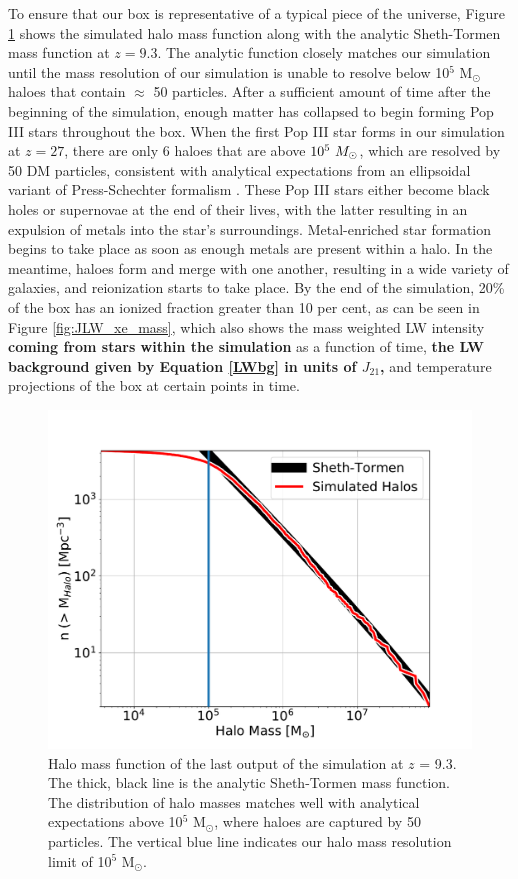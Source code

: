 \documentclass[fleqn,usenatbib]{mnras}
\begin{document}
To ensure that our box is representative of a typical piece of the universe, Figure \ref{fig:hmf} shows the simulated halo mass function along with the analytic Sheth-Tormen mass function at $z = 9.3$. The analytic function closely matches our simulation until the mass resolution of our simulation is unable to resolve below 10$^{5}$ M$_{\odot}$ haloes that contain $\approx$ 50 particles. After a sufficient amount of time after the beginning of the simulation, enough matter has collapsed to begin forming Pop III stars throughout the box. When the first Pop III star forms in our simulation at $z = 27$, there are only 6 haloes that are above $10^5~\Ms$, which are resolved by 50 DM particles, consistent with analytical expectations from an ellipsoidal variant of Press-Schechter formalism \citep{PS74,Sheth01}. These Pop III stars either become black holes or supernovae at the end of their lives, with the latter resulting in an expulsion of metals into the star's surroundings. Metal-enriched star formation begins to take place as soon as enough metals are present within a halo. In the meantime, haloes form and merge with one another, resulting in a wide variety of galaxies, and reionization starts to take place. By the end of the simulation, 20\% of the box has an ionized fraction greater than 10 per cent, as can be seen in Figure \ref{fig:JLW_xe_mass}, which also shows the mass weighted LW intensity \textbf{coming from stars within the simulation} as a function of time, \textbf{the LW background given by Equation \ref{LWbg} in units of $J_{21}$,} and temperature projections of the box at certain points in time. 

\begin{figure}
	\includegraphics[width=\columnwidth]{images/hmf.pdf}
    \caption{Halo mass function of the last output of the simulation at $z$ = 9.3. The thick, black line is the analytic Sheth-Tormen mass function. The distribution of halo masses matches well with analytical expectations above 10$^{5}$ M$_{\odot}$, where haloes are captured by 50 particles. The vertical blue line indicates our halo mass resolution limit of 10$^{5}$ M$_{\odot}$.}
    \label{fig:hmf}
\end{figure}
\end{document}
